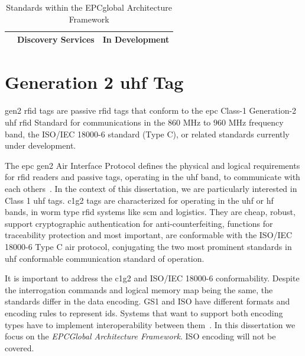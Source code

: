\begin{table}[]
\begin{adjustwidth}{-0.09\textwidth}{0em}
\begin{tabular}{|l|l|l|}
                                                                                            & Discovery Services                                                                                                                                          & In Development                                                                                                                                                                                                                 \\ \hline
    \end{tabular}
    \end{adjustwidth}
    \caption{Standards within the EPCglobal Architecture Framework} 
    \label{tab:standards}
\end{table}

\section{Generation 2 \ac{uhf} Tag}

\ac{gen2} \ac{rfid} tags are passive \ac{rfid} tags that conform to the \ac{epc} Class-1 Generation-2 \ac{uhf} \ac{rfid} Standard for communications in the $860$ MHz to $960$ MHz frequency band, the ISO/IEC 18000-6 standard (Type C), or related standards currently under development.

The \ac{epc} \acl{gen2} Air Interface Protocol defines the physical and logical requirements for \ac{rfid} readers and passive tags, operating in the \ac{uhf} band, to communicate with each others~\cite{UHFGen2Tag}.
In the context of this dissertation, we are particularly interested in Class 1 \ac{uhf} tags. \ac{c1g2} tags are characterized for operating in the \ac{uhf} or \ac{hf}~\cite{HFClassTag} bands, in \ac{worm} type \ac{rfid} systems like \ac{scm} and logistics.
They are cheap, robust, support cryptographic authentication for anti-counterfeiting, functions for traceability protection and most important, are conformable with the ISO/IEC 18000-6 Type C air protocol, conjugating the two most prominent standards in \ac{uhf} conformable communication standard of operation.

It is important to address the \ac{c1g2} and ISO/IEC 18000-6 conformability. Despite the interrogation commands and logical memory map being the same, the standards differ in the data encoding. 
GS1 and ISO have different formats and encoding rules to represent \acp{id}.
Systems that want to support both encoding types have to implement interoperability between them~\cite{mizutaniMulticodePortableRFID2016a}.
In this dissertation we focus on the \emph{EPCGlobal Architecture Framework}. ISO encoding will not be covered.

